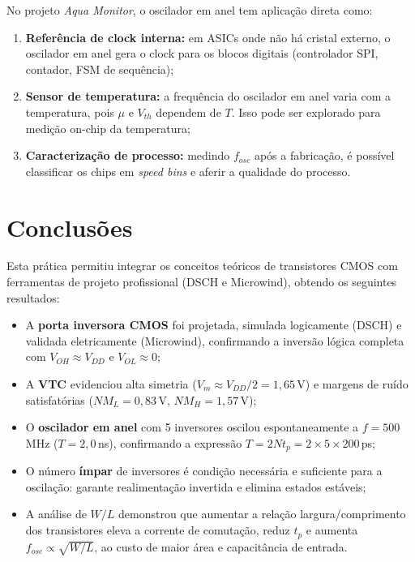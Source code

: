\documentclass[12pt,a4paper]{article}
\begin{document}
\begin{unidadebox}
  No projeto \textit{Aqua Monitor}, o oscilador em anel tem aplicação direta como:
  \begin{enumerate}[leftmargin=1.2cm]
    \item \textbf{Referência de clock interna:} em ASICs onde não há cristal externo,
          o oscilador em anel gera o clock para os blocos digitais (controlador SPI,
          contador, FSM de sequência);
    \item \textbf{Sensor de temperatura:} a frequência do oscilador em anel varia com
          a temperatura, pois $\mu$ e $V_{th}$ dependem de $T$. Isso pode ser explorado
          para medição on-chip da temperatura;
    \item \textbf{Caracterização de processo:} medindo $f_{osc}$ após a fabricação,
          é possível classificar os chips em \textit{speed bins} e aferir a qualidade
          do processo.
  \end{enumerate}
\end{unidadebox}

\section{Conclusões}

Esta prática permitiu integrar os conceitos teóricos de transistores CMOS com
ferramentas de projeto profissional (DSCH e Microwind), obtendo os seguintes resultados:

\begin{itemize}[leftmargin=1.5cm]
  \item A \textbf{porta inversora CMOS} foi projetada, simulada logicamente (DSCH)
        e validada eletricamente (Microwind), confirmando a inversão lógica completa
        com $V_{OH} \approx V_{DD}$ e $V_{OL} \approx 0$;

  \item A \textbf{VTC} evidenciou alta simetria ($V_m \approx V_{DD}/2 = 1{,}65$\,V)
        e margens de ruído satisfatórias ($NM_L = 0{,}83$\,V, $NM_H = 1{,}57$\,V);

  \item O \textbf{oscilador em anel} com 5 inversores oscilou espontaneamente a
        $f = 500$\,MHz ($T = 2{,}0$\,ns), confirmando a expressão
        $T = 2Nt_p = 2 \times 5 \times 200$\,ps;

  \item O número \textbf{ímpar} de inversores é condição necessária e suficiente
        para a oscilação: garante realimentação invertida e elimina estados estáveis;

  \item A análise de $W/L$ demonstrou que aumentar a relação largura/comprimento
        dos transistores eleva a corrente de comutação, reduz $t_p$ e aumenta
        $f_{osc} \propto \sqrt{W/L}$, ao custo de maior área e capacitância
        de entrada.
\end{itemize}
\end{document}
